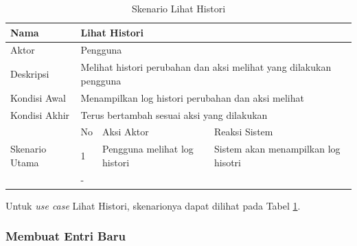 \begin{table}
\centering
\caption[Tabel Skenario Lihat Histori]{Skenario Lihat Histori}
\label{tab:skenariohistori}
\begin{tabular}{|p{1.4cm}|p{0.4cm}|p{2cm}|p{2cm}|p{2cm}|p{2cm}|}
\hline
Nama & \multicolumn{5}{p{8cm}|}{Lihat Histori} \\ \hline
Aktor & \multicolumn{5}{p{8cm}|}{Pengguna} \\ \hline
Deskripsi & \multicolumn{5}{p{8cm}|}{Melihat histori perubahan dan aksi melihat
yang dilakukan pengguna} \\ \hline
Kondisi Awal & \multicolumn{5}{p{8cm}|}{Menampilkan log histori perubahan dan
aksi melihat} \\ \hline
Kondisi Akhir & \multicolumn{5}{p{8cm}|}{Terus bertambah sesuai aksi yang
dilakukan} \\ \hline
\multirow{3}{*}{\parbox{1.4cm}{Skenario Utama}} & No &
\multicolumn{2}{p{4cm}|}{Aksi Aktor} & \multicolumn{2}{p{4cm}|}{Reaksi Sistem}
\\ \cline{2-6}
& 1 & \multicolumn{2}{p{4cm}|}{Pengguna melihat log histori} &
\multicolumn{2}{p{4cm}|}{Sistem akan menampilkan log hisotri} \\ \hline
Eksepsi & \multicolumn{5}{p{8cm}|}{-} \\ \hline
\end{tabular}
\end{table}

Untuk {\it use case} Lihat Histori, skenarionya dapat dilihat pada Tabel
\ref{tab:skenariohistori}.

\subsubsection{Membuat Entri Baru}

